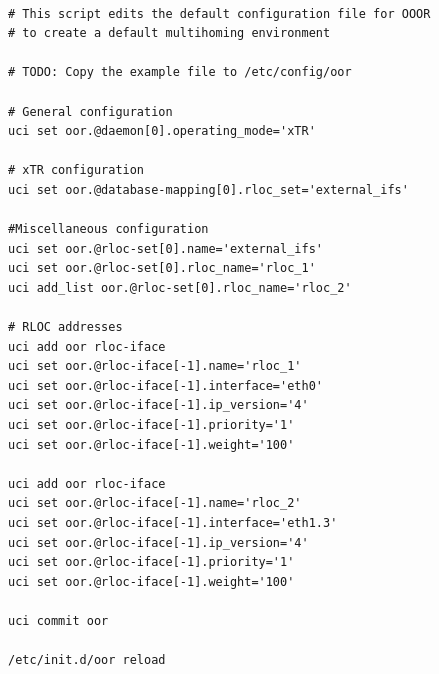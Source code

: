\documentclass[11pt]{article}
\begin{document}
\begin{lstlisting}[frame=single]

# This script edits the default configuration file for OOOR
# to create a default multihoming environment

# TODO: Copy the example file to /etc/config/oor

# General configuration
uci set oor.@daemon[0].operating_mode='xTR'

# xTR configuration
uci set oor.@database-mapping[0].rloc_set='external_ifs'

#Miscellaneous configuration
uci set oor.@rloc-set[0].name='external_ifs'
uci set oor.@rloc-set[0].rloc_name='rloc_1'
uci add_list oor.@rloc-set[0].rloc_name='rloc_2'

# RLOC addresses
uci add oor rloc-iface
uci set oor.@rloc-iface[-1].name='rloc_1'
uci set oor.@rloc-iface[-1].interface='eth0'
uci set oor.@rloc-iface[-1].ip_version='4'
uci set oor.@rloc-iface[-1].priority='1'
uci set oor.@rloc-iface[-1].weight='100'

uci add oor rloc-iface
uci set oor.@rloc-iface[-1].name='rloc_2'
uci set oor.@rloc-iface[-1].interface='eth1.3'
uci set oor.@rloc-iface[-1].ip_version='4'
uci set oor.@rloc-iface[-1].priority='1'
uci set oor.@rloc-iface[-1].weight='100'

uci commit oor

/etc/init.d/oor reload
\end{lstlisting}
\end{document}
